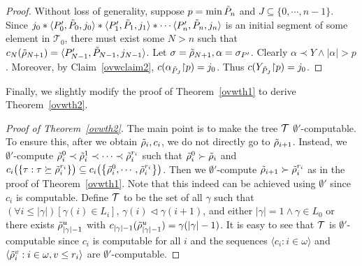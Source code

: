\begin{proof}
Without loss of generality,
suppose $p = \min \tilde{P}_n$
and $J\subseteq \{0,\cdots,n-1\}$.
Since $j_0*\langle P'_0,\tilde{P}_0,j_0\rangle*\langle P'_1,\tilde{P}_1,j_1\rangle*\cdots
 \langle P'_n,\tilde{P}_n,j_n\rangle$ is an initial segment of some element in
 $\mathcal{T}_0$,
there must exist some
$N>n$
 such that
 $c_N(\tilde{\rho}_{N+1}) = \langle P'_{N-1},\tilde{P}_{N-1},j_{N-1}\rangle$.
 Let $\sigma = \tilde{\rho}_{N+1}, \alpha =\sigma_{P'}$. Clearly
 $\alpha\prec Y\wedge |\alpha|>p$. Moreover,
 by Claim~\ref{ovwclaim2},
 $c(\alpha_{\tilde{P}_J}{\upharpoonright} p) = j_0$.
 Thus $c(Y_{\tilde{P}_J}{\upharpoonright} p) = j_0$.

\end{proof}

Finally, we slightly modify the proof of Theorem~\ref{ovwth1}
to derive Theorem~\ref{ovwth2}.

\begin{proof}[Proof of Theorem~\ref{ovwth2}]
The main point is to make the tree
$\mathcal{T}$ $\emptyset'$-computable.
To ensure this, after we obtain
$\tilde{\rho}_i,c_i$, we do not
directly go to $\tilde{\rho}_{i+1}$.
Instead, we $\emptyset'$-compute
$\tilde{\rho}_i^{0}\prec\tilde{\rho}_i^1\prec\cdots
\prec\tilde{\rho}_i^{r_i}$
such that $\tilde{\rho}_i^0\succ\tilde{\rho}_i$ and
$c_i\big(
\{\tau:\tau\succeq \tilde{\rho}_i^{r_i} \}\big)
 \subseteq c_i\big(\big\{\tilde{\rho}_i^0,\cdots,\tilde{\rho}^{r_i}_i \big\}
 \big)$. Then we $\emptyset'$-compute $\tilde{\rho}_{i+1}\succ
 \tilde{\rho}_i^{r_i}$ as in the proof of Theorem~\ref{ovwth1}.
 Note that this indeed can be
 achieved using $\emptyset'$ since
 $c_i$ is computable.
 Define $\mathcal{T}$ to be
 the set of all $\gamma$ such that
 $(\forall i\leq |\gamma|)[\gamma(i)\in L_i]$,
$\gamma(i) \lhd \gamma(i+1)$,
 and either $|\gamma| = 1\wedge \gamma\in L_0$ or
 there exists $\tilde{\rho}_{|\gamma|-1}^u$
 with $c_{|\gamma|-1}(\tilde{\rho}_{|\gamma|-1}^u)
 =\gamma(|\gamma|-1)$.
 It is easy to see
that $\mathcal{T}$ is $\emptyset'$-computable
since $c_i$ is computable for all $i$ and
the sequences $\langle c_i : i \in \omega \rangle$ and
$\langle \tilde{\rho}_i^v : i\in\omega, v\leq r_i \rangle$
are $\emptyset'$-computable.


\end{proof}
